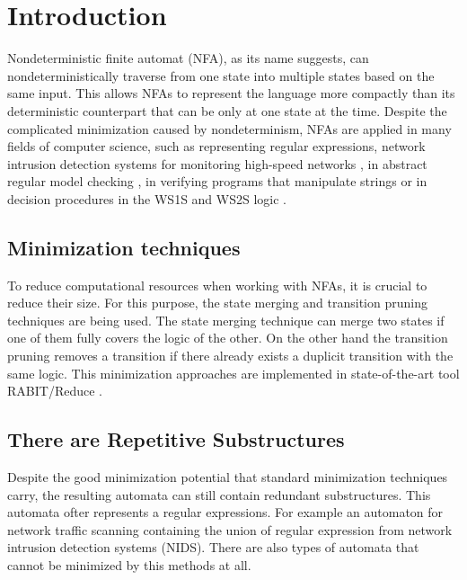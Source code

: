 \documentclass{ExcelAtFIT}
\affiliation{*%
  \href{mailto:xsedym02@stud.fit.vutbr.cz}{xsedym02@stud.fit.vutbr.cz},
  \textit{Faculty of Information Technology, Brno University of Technology}}
\begin{document}
\startdocument


\section{Introduction}
	Nondeterministic finite automat (NFA), as its name suggests, can nondeterministically traverse from one state into multiple states based on the same input. This allows NFAs to represent the language more compactly than its deterministic counterpart that can be only at one state at the time. Despite the complicated minimization caused by nondeterminism, NFAs are applied in many fields of computer science, such as representing regular expressions, network intrusion detection systems for monitoring high-speed networks \cite{FPGA_based_network_scaning, ApproxRed}, in abstract regular model checking \cite{ARMC}, in verifying programs that manipulate strings \cite{String_constraints_for_ver} or in decision procedures in the WS1S and WS2S logic \cite{On_equivalence_checking, Nested_antichains_for_WS1S}.

	\subsection*{Minimization techniques}
		To reduce computational resources when working with NFAs, it is crucial to reduce their size. For this purpose, the state merging \cite{Oldest_Merge,Simulation_based_minimization,On_nfa_reduction} and transition pruning \cite{Simulation_based_minimization, Lorenzo_prunning_saturation} techniques are being used. The state merging technique can merge two states if one of them fully covers the logic of the other. On the other hand the transition pruning removes a transition if there already exists a duplicit transition with the same logic. This minimization approaches are implemented in state-of-the-art tool RABIT/Reduce \cite{RABIT}.

	\subsection*{There are Repetitive Substructures}
		Despite the good minimization potential that standard minimization techniques carry, the resulting automata can still contain redundant substructures. This automata ofter represents a regular expressions. For example an automaton for network traffic scanning containing the union of regular expression from network intrusion detection systems (NIDS). There are also types of automata that cannot be minimized by this methods at all.
\end{document}

